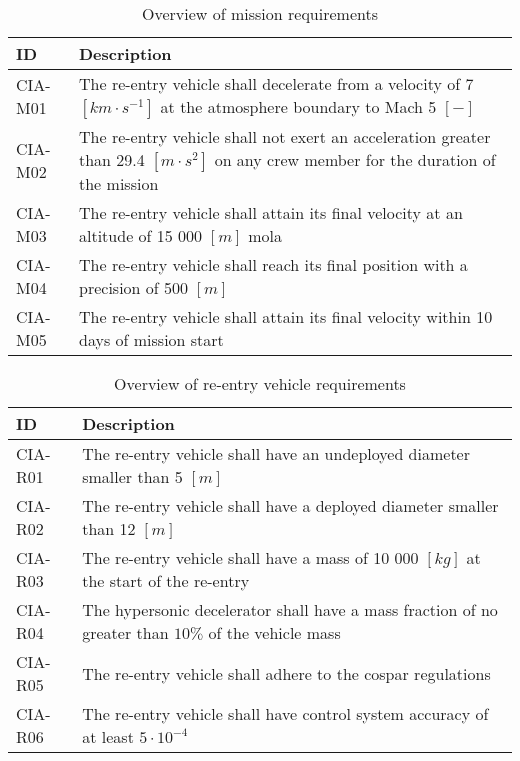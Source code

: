 \begin{table}[h]
	\caption{Overview of mission requirements}
	\label{tab:misreq} 
	\begin{tabular}{|p{}|p{}|}
    \hline
    \textbf{ID}          & \textbf{Description}                                                                                                      \\ \hline \hline
    CIA-M01& The re-entry vehicle shall decelerate from a velocity of 7 $[km\cdot s ^{-1}]$ at the atmosphere boundary to Mach 5 $[-]$  \\ \hline
    CIA-M02 & The re-entry vehicle shall not exert an acceleration greater than 29.4 $[m \cdot s^{2}]$ on any crew member for the duration of the mission			\\ \hline
    	CIA-M03 & The re-entry vehicle shall attain its final velocity at an altitude of 15 000 $[m]$ \gls{mola} \\ \hline
    	CIA-M04 & The re-entry vehicle shall reach its final position with a precision of 500 $[m]$\\ \hline
    	CIA-M05 & The re-entry vehicle shall attain its final velocity within 10 days of mission start \\ \hline
    \end{tabular}
\end{table}

\begin{table}[h]
	\caption{Overview of re-entry vehicle requirements} 
	\label{tab:vehreq}
	\begin{tabular}{|p{}|p{}|}
	    \hline
	    \textbf{ID}          & \textbf{Description}                                                                                                     \\ \hline \hline
	CIA-R01 & The re-entry vehicle shall have an undeployed diameter smaller than 5 $[m]$                         				            \\ \hline
	CIA-R02 & The re-entry vehicle shall have a deployed diameter smaller than 12 $[m]$                         				            \\ \hline	
	CIA-R03 & The re-entry vehicle shall have a mass of 10 000 $[kg]$ at the start of the re-entry                       				            \\ \hline
	CIA-R04 & The hypersonic decelerator shall have a mass fraction of no greater than $10\%$ of the vehicle mass  \\ \hline
	CIA-R05 &  The re-entry vehicle shall adhere to the \gls{cospar} regulations \\ \hline
	CIA-R06 &  The re-entry vehicle shall have control system accuracy of at least $5\cdot 10^{-4}$  \\ \hline
    \end{tabular}
\end{table}




